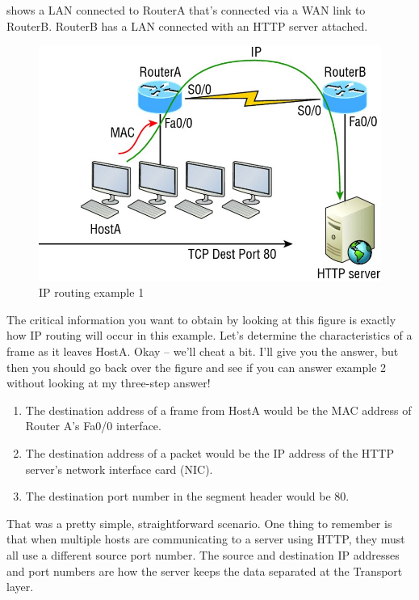  shows a LAN connected to RouterA that's connected via a WAN link to RouterB.
RouterB has a LAN connected with an HTTP server attached.

\begin{figure}
   \centering
   \includegraphics{images/c09f004.jpg}
   \caption{IP routing example 1}
   \label{fig:ip-routing-ex-1}
\end{figure}

The critical information you want to obtain by looking at this figure is exactly how IP routing will occur in this example.
Let's determine the characteristics of a frame as it leaves HostA.
Okay -- we'll cheat a bit.
I'll give you the answer, but then you should go back over the figure and see if you can answer example 2 without looking at my three-step answer!

\begin{enumerate}
\item
The destination address of a frame from HostA would be the MAC address of Router A's Fa0/0 interface.
\item
The destination address of a packet would be the IP address of the HTTP server's network interface card (NIC).
\item
The destination port number in the segment header would be 80.
\end{enumerate}

That was a pretty simple, straightforward scenario. One thing to
remember is that when multiple hosts are communicating to a server using
HTTP, they must all use a different source port number. The source and
destination IP addresses and port numbers are how the server keeps the
data separated at the Transport layer.

